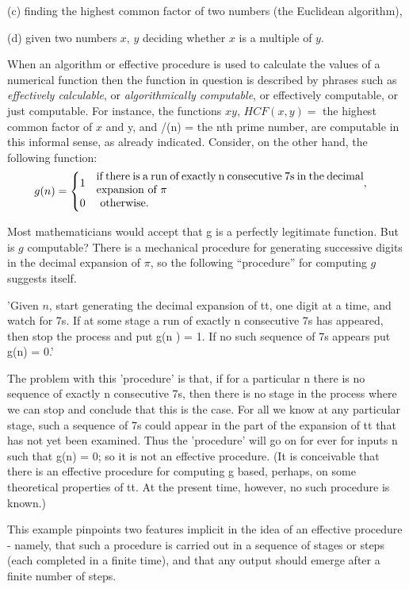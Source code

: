(c) finding the highest common factor of two numbers (the 
Euclidean algorithm), 

(d) given two numbers $x$, $y$ deciding whether $x$ is a multiple of $y$. 


When an algorithm or effective procedure is used to calculate the 
values of a numerical function then the function in question is described 
by phrases such as \emph{effectively calculable}, or \emph{algorithmically computable}, or 
effectively computable, or just computable. For instance, the functions $xy$, 
$HCF(x, y) =$ the highest common factor of $x$ and y, and /(n) = the nth 
prime number, are computable in this informal sense, as already 
indicated. Consider, on the other hand, the following function: 
\[
g(n) = \begin{cases}
1\quad \parbox{0.7\textwidth}{ if there is a run of exactly n consecutive 7s in the decimal expansion of $\pi$},\\
0\quad \text{ otherwise.}
\end{cases}
\]
 
 
Most mathematicians would accept that g is a perfectly legitimate 
function. But is $g$ computable? There is a mechanical procedure for 
generating successive digits in the decimal expansion of $\pi$, so the 
following ``procedure'' for computing $g$ suggests itself. 
 
'Given $n$, start generating the decimal expansion of tt, one digit at a 
time, and watch for 7s. If at some stage a run of exactly n consecutive 7s 
has appeared, then stop the process and put g(n ) = 1. If no such sequence 
of 7s appears put g(n) = 0.' 

The problem with this 'procedure' is that, if for a particular n there is no 
sequence of exactly n consecutive 7s, then there is no stage in the process 
where we can stop and conclude that this is the case. For all we know at 
any particular stage, such a sequence of 7s could appear in the part of the 
expansion of tt that has not yet been examined. Thus the 'procedure' will 
go on for ever for inputs n such that g(n) = 0; so it is not an effective 
procedure. (It is conceivable that there is an effective procedure for 
computing g based, perhaps, on some theoretical properties of tt. At the 
present time, however, no such procedure is known.) 

This example pinpoints two features implicit in the idea of an effective 
procedure - namely, that such a procedure is carried out in a sequence of 
stages or steps (each completed in a finite time), and that any output 
should emerge after a finite number of steps. 

